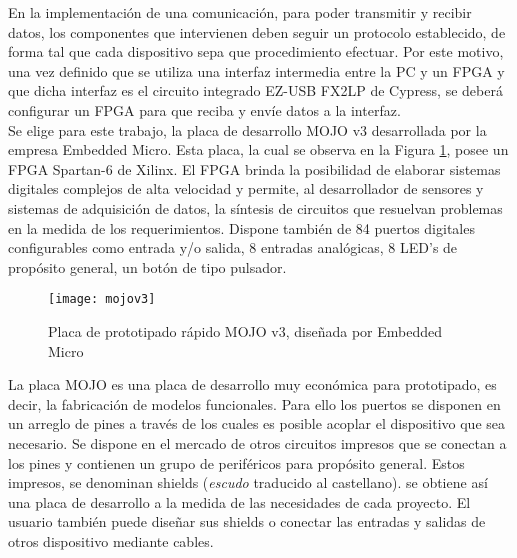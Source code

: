 
En la implementación de una comunicación, para poder transmitir y recibir datos, los componentes que intervienen deben seguir un protocolo establecido, de forma tal que cada dispositivo sepa que procedimiento efectuar. Por este motivo, una vez definido que se utiliza una interfaz intermedia entre la PC y un FPGA y que dicha interfaz es el circuito integrado EZ-USB FX2LP de Cypress, se deberá configurar un FPGA para que reciba y envíe datos a la interfaz.\\

Se elige para este trabajo, la placa de desarrollo MOJO v3 desarrollada por la empresa Embedded Micro. Esta placa, la cual se observa en la Figura \ref{mojo}, posee un FPGA Spartan-6 de Xilinx. El FPGA brinda la posibilidad de elaborar sistemas digitales complejos de alta velocidad y permite, al desarrollador de sensores y sistemas de adquisición de datos, la síntesis de circuitos que resuelvan problemas en la medida de los requerimientos. Dispone también de 84 puertos digitales configurables como entrada y/o salida, 8 entradas analógicas, 8 LED's de propósito general, un botón de tipo pulsador.\\

\begin{figure}
	\centering
	\texttt{[image: mojov3]}
	\caption{Placa de prototipado rápido MOJO v3, diseñada por Embedded Micro}
	\label{mojo}
\end{figure}

La placa MOJO es una placa de desarrollo muy económica para prototipado, es decir, la fabricación de modelos funcionales. Para ello los puertos se disponen en un arreglo de pines a través de los cuales es posible acoplar el dispositivo que sea necesario. Se dispone en el mercado de otros circuitos impresos que se conectan a los pines y contienen un grupo de periféricos para propósito general. Estos impresos, se denominan shields ({\it escudo} traducido al castellano). se obtiene así una placa de desarrollo a la medida de las necesidades de cada proyecto. El usuario también puede diseñar sus shields o conectar las entradas y salidas de otros dispositivo mediante cables.%

